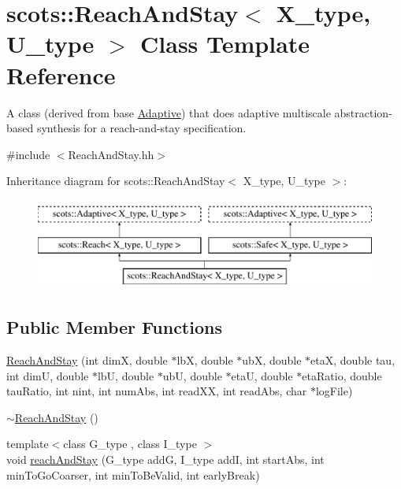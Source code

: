 \hypertarget{classscots_1_1ReachAndStay}{}\section{scots\+:\+:Reach\+And\+Stay$<$ X\+\_\+type, U\+\_\+type $>$ Class Template Reference}
\label{classscots_1_1ReachAndStay}


A class (derived from base \hyperlink{classscots_1_1Adaptive}{Adaptive}) that does adaptive multiscale abstraction-\/based synthesis for a reach-\/and-\/stay specification.  




{\ttfamily \#include $<$Reach\+And\+Stay.\+hh$>$}

Inheritance diagram for scots\+:\+:Reach\+And\+Stay$<$ X\+\_\+type, U\+\_\+type $>$\+:\begin{figure}[H]
\begin{center}
\leavevmode
\includegraphics[height=3.000000cm]{classscots_1_1ReachAndStay}
\end{center}
\end{figure}
\subsection*{Public Member Functions}
\begin{DoxyCompactItemize}
\item 
\hyperlink{classscots_1_1ReachAndStay_ae4bd2a2de95e4cd1287523c49b0b974d}{Reach\+And\+Stay} (int dimX, double $\ast$lbX, double $\ast$ubX, double $\ast$etaX, double tau, int dimU, double $\ast$lbU, double $\ast$ubU, double $\ast$etaU, double $\ast$eta\+Ratio, double tau\+Ratio, int nint, int num\+Abs, int read\+XX, int read\+Abs, char $\ast$log\+File)
\item 
\hyperlink{classscots_1_1ReachAndStay_a03d6d40d05fc810d88965b3f7a78c2fe}{$\sim$\+Reach\+And\+Stay} ()
\item 
{\footnotesize template$<$class G\+\_\+type , class I\+\_\+type $>$ }\\void \hyperlink{classscots_1_1ReachAndStay_a8615d9a4050bbb186a38fe0e3ae97c69}{reach\+And\+Stay} (G\+\_\+type addG, I\+\_\+type addI, int start\+Abs, int min\+To\+Go\+Coarser, int min\+To\+Be\+Valid, int early\+Break)
\end{DoxyCompactItemize}
